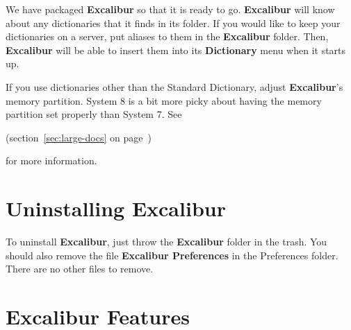 \documentclass[11pt,titlepage]{article}
\newcommand{\ex}{\textbf{Excalibur}}
\begin{document}
We have packaged \ex{} so that it is ready to go.  \ex{} will know
about any dictionaries that it finds in its folder.  If you would like
to keep your dictionaries on a server, put aliases to them in the
\ex{} folder.  Then, \ex{} will be able to insert them into its
\textbf{Dictionary} menu when it starts up.

If you use dictionaries other than the Standard Dictionary, adjust
\ex's memory partition.  System 8 is a bit more picky about having the
memory partition set properly than System 7.  See
\begin{latexonly}
  (section~\ref{sec:large-docs} on page~\pageref{sec:large-docs})
\end{latexonly}
for more information.

\section{Uninstalling Excalibur}

To uninstall \ex, just throw the \ex{} folder in the trash.  You
should also remove the file \textbf{Excalibur Preferences} in the
Preferences folder.  There are no other files to remove.

\section{Excalibur Features}
\end{document}
